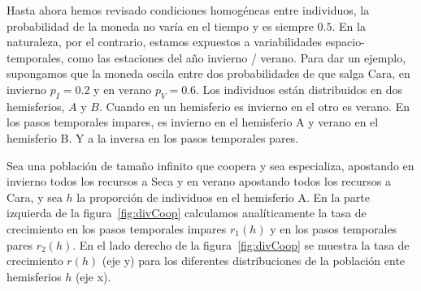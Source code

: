 \documentclass[a4paper,11pt]{book}
\theoremstyle{definition}
\begin{document}
Hasta ahora hemos revisado condiciones homog\'eneas entre individuos, la probabilidad de la moneda no var\'ia en el tiempo y es siempre $0.5$.
%
En la naturaleza, por el contrario, estamos expuestos a variabilidades espacio-temporales, como las estaciones del a\~no invierno / verano.
%
Para dar un ejemplo, supongamos que la moneda oscila entre dos probabilidades de que salga Cara, en invierno $p_I = 0.2$ y en verano $p_V = 0.6$.
%
Los individuos est\'an distribuidos en dos hemisferios, $A$ y $B$.
%
Cuando en un hemisferio es invierno en el otro es verano.
%
En los pasos temporales impares, es invierno en el hemisferio A y verano en el hemisferio B.
%
Y a la inversa en los pasos temporales pares.
%


Sea una poblaci\'on de tama\~no infinito que coopera y sea especializa, apostando en invierno todos los recursos a Seca y en verano apostando todos los recursos a Cara, y sea $h$ la proporci\'on de individuos en el hemisferio A.
%
En la parte izquierda de la figura~\ref{fig:divCoop} calculamos anal\'iticamente la tasa de crecimiento en los pasos temporales impares $r_1(h)$ y en los pasos temporales pares $r_2(h)$.
%
En el lado derecho de la figura~\ref{fig:divCoop} se muestra la tasa de crecimiento $r(h)$ (eje y) para los diferentes distribuciones de la poblaci\'on ente hemisferios $h$ (eje x).
%
\end{document}
